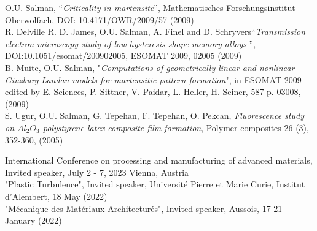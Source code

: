 \documentclass[paper=a4,fontsize=11pt]{temp} %
\begin{document}
 O.U. Salman, “\textit{Criticality in martensite}”, Mathematisches Forschungsinstitut Oberwolfach, DOI: 10.4171/OWR/2009/57 (2009) \\

R. Delville R. D. James, O.U. Salman, A. Finel and D. Schryvers“\textit{Transmission  electron  microscopy  study  of  low-hysteresis  shape  memory alloys }”, DOI:10.1051/esomat/200902005, ESOMAT 2009, 02005 (2009) \\

B. Muite, O.U. Salman, "\textit{Computations of geometrically linear and nonlinear Ginzburg-Landau models for martensitic pattern formation}", in ESOMAT 2009 edited by E. Sciences, P. Sittner, V. Paidar, L. Heller, H. Seiner, 587
p. 03008, (2009) \\

S. Ugur, O.U. Salman, G. Tepehan, F. Tepehan, O. Pekcan, \textit{Fluorescence study on $Al_2O_3$ polystyrene latex composite film formation},
Polymer composites 26 (3), 352-360, (2005)

%
%



\hspace{3mm}

International Conference on processing and manufacturing  of advanced materials, Invited speaker, July 2 - 7, 2023
Vienna, Austria\\

"Plastic Turbulence", Invited speaker, Université Pierre et Marie Curie, Institut d'Alembert,  18 May (2022)\\

"Mécanique des Matériaux Architecturés", Invited speaker, Aussois, 17-21 January (2022)\\
\end{document}
